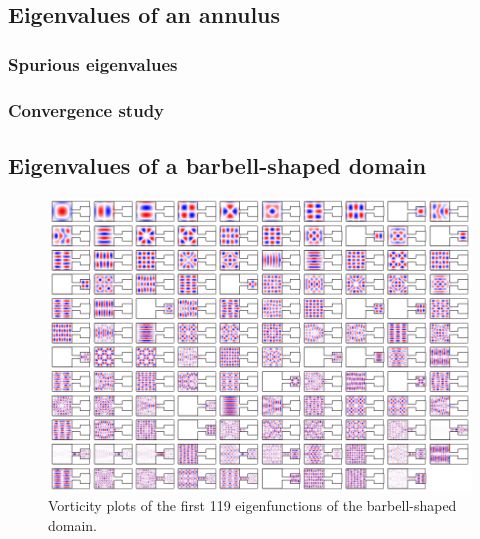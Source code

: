 \subsection{Eigenvalues of an annulus}

\subsubsection{Spurious eigenvalues}
\label{subsec:spurannulus}



\subsubsection{Convergence study}
\label{subsec:convannulus}

\subsection{Eigenvalues of a barbell-shaped domain}
\label{subsec:barbell}

\begin{figure}
  \centering
  \includegraphics[width=\textwidth]{fig/barbell_gallery}
  \caption{Vorticity plots of the first 119 eigenfunctions
    of the barbell-shaped domain.}
  \label{fig:barbell_gallery}
\end{figure}

